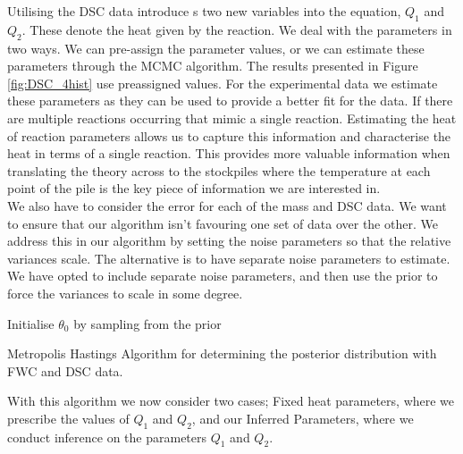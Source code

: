 Utilising the DSC data introduce s two new variables into the equation, $Q_1$ and $Q_2$. These denote the heat given by the reaction. We deal with the parameters in two ways. We can pre-assign the parameter values, or we can estimate these parameters through the MCMC algorithm. The results presented in Figure \ref{fig:DSC_4hist} use preassigned values. For the experimental data we estimate these parameters as they can be used to provide a better fit for the data. If there are multiple reactions occurring that mimic a single reaction. Estimating the heat of reaction parameters allows us to capture this information and characterise the heat in terms of a single reaction. This provides more valuable information when translating the theory across to the stockpiles where the temperature at each point of the pile is the key piece of information we are interested in.\\
We also have to consider the error for each of the mass and DSC data. We want to ensure that our algorithm isn't favouring one set of data over the other. We address this in our algorithm by setting the noise parameters so that the relative variances scale. The alternative is to have separate noise parameters to estimate. We have opted to include separate noise parameters, and then use the prior to force the variances to scale in some degree.\\

\begin{algorithm}[H]
\SetAlgoLined
\KwResult{}
 Initialise $\theta_0$ by sampling from the prior\;
 \caption{Metropolis Hastings Algorithm for determining the posterior distribution with FWC and DSC data.}
 \label{Alg:MH_DSC}
\end{algorithm}

With this algorithm we now consider two cases; Fixed heat parameters, where we prescribe the values of $Q_1$ and $Q_2$, and our Inferred Parameters, where we conduct inference on the parameters $Q_1$ and $Q_2$.  
